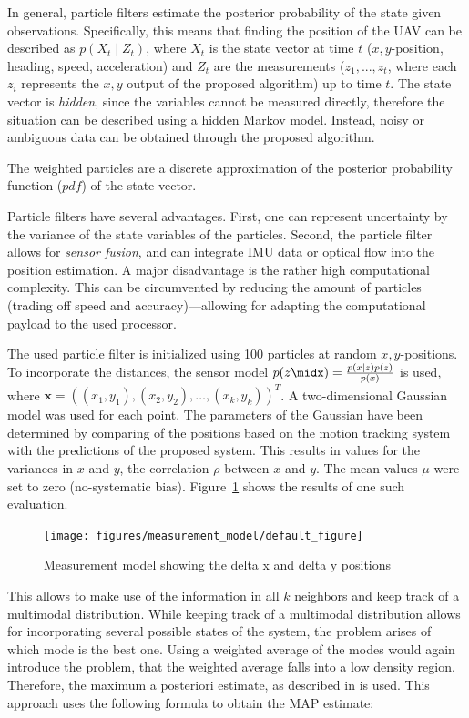 In general, particle filters estimate the posterior probability of the
state given observations. Specifically, this means that finding the
position of the UAV can be described as $p(X_t \mid Z_t)$, where $X_t$
is the state vector at time $t$ ($x,y$-position, heading, speed,
acceleration) and $Z_t$ are the measurements ($z_1, ..., z_t$, where
each $z_i$ represents the $x,y$ output of the proposed algorithm) up
to time $t$. The state vector is \emph{hidden}, since the variables
cannot be measured directly, therefore the situation can be described
using a hidden Markov model. Instead, noisy or ambiguous data can be
obtained through the proposed algorithm.

The weighted particles are a discrete approximation of the posterior
probability function ($pdf$) of the state vector.

Particle filters have several advantages. First, one can represent
uncertainty by the variance of the state variables of the
particles. Second, the particle filter allows for \emph{sensor fusion}, and
can integrate IMU data or optical flow into the position estimation.
A major disadvantage is the rather high computational complexity. This
can be circumvented by reducing the amount of particles (trading off
speed and accuracy)---allowing for adapting the computational payload
to the used processor.

The used particle filter is initialized using 100 particles at random
$x, y$-positions. To incorporate the distances, the sensor model $p(z
\midx) = \frac{p(x \mid z)p(z)}{p(x)}$ is used, where $\textbf{x} =
((x_1, y_1), (x_2, y_2), \ldots, (x_k, y_k))^T$. A two-dimensional
Gaussian model was used for each point. The parameters of the Gaussian
have been determined by comparing of the positions based on the motion
tracking system with the predictions of the proposed system. This
results in values for the variances in $x$ and $y$, the correlation
$\rho$ between $x$ and $y$. The mean values $\mu$ were set to zero
(no-systematic bias). Figure~\ref{fig:measurementmodel} shows the
results of one such evaluation.

\begin{figure}[h!]
\begin{center}
\texttt{[image: figures/measurement\_model/default\_figure]}
\caption{{\label{fig:measurementmodel} Measurement model showing the delta x and delta y
    positions%
}}
\end{center}
\end{figure}

This allows to make use of the information in all $k$ neighbors and
keep track of a multimodal distribution. While keeping track of a
multimodal distribution allows for incorporating several possible
states of the system, the problem arises of which mode is the best
one. Using a weighted average of the modes would again introduce the
problem, that the weighted average falls into a low density
region. Therefore, the maximum a posteriori estimate, as described in
\cite{driessen2008map} is used. This approach uses the following
formula to obtain the MAP estimate:

